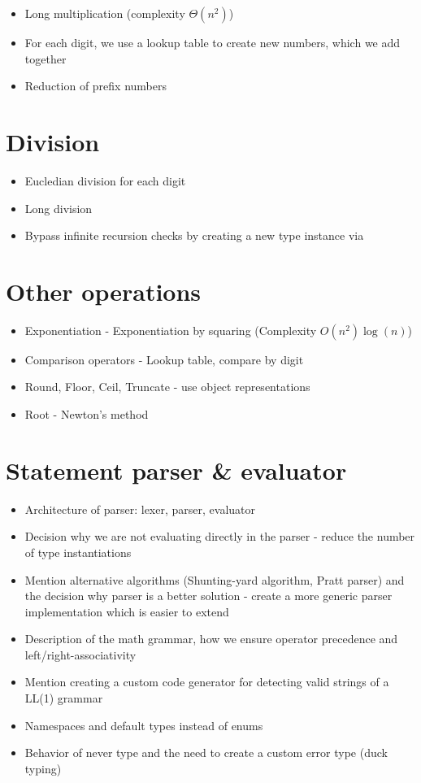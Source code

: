 \begin{itemize}
  \item Long multiplication (complexity $\Theta(n^2)$)
  \item For each digit, we use a lookup table to create new numbers, which we add together
  \item Reduction of prefix numbers
\end{itemize}

\section{Division}

\begin{itemize}
  \item Eucledian division for each digit
  \item Long division
  \item Bypass infinite recursion checks by creating a new type instance via 
\end{itemize}

\section{Other operations}

\begin{itemize}
  \item Exponentiation - Exponentiation by squaring (Complexity $O(n^2)\log(n)$)
  \item Comparison operators - Lookup table, compare by digit
  \item Round, Floor, Ceil, Truncate - use object representations
  \item Root - Newton's method
\end{itemize}

\section{Statement parser \& evaluator}

\begin{itemize}
  \item Architecture of parser: lexer, parser, evaluator
  \item Decision why we are not evaluating directly in the parser - reduce the number of type instantiations
  \item Mention alternative algorithms (Shunting-yard algorithm, Pratt parser) and the decision why parser is a better solution - create a more generic parser implementation which is easier to extend
  \item Description of the math grammar, how we ensure operator precedence and left/right-associativity
  \item Mention creating a custom code generator for detecting valid strings of a LL(1) grammar
  \item Namespaces and default types instead of enums
  \item Behavior of never type and the need to create a custom error type (duck typing)
\end{itemize}


